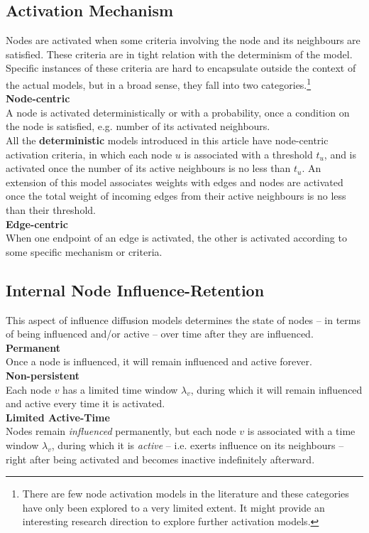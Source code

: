\documentclass[twocolumn, 10pt]{article}
\begin{document}
\subsection{Activation Mechanism}
Nodes are activated when some criteria involving the node and its neighbours are satisfied. These criteria are in tight relation with the determinism of the model. Specific instances of these criteria are hard to encapsulate outside the context of the actual models, but in a broad sense, they fall into two categories.\footnote{There are few node activation models in the literature and these categories have only been explored to a very limited extent. It might provide an interesting research direction to explore further activation models.}\\
\textbf{Node-centric} \\
A node is activated deterministically or with a probability, once a condition on the node is satisfied, e.g. number of its activated neighbours. \\
All the \textbf{deterministic} models introduced in this article have node-centric activation criteria, in which each node $u$ is associated with a threshold $t_u$, and is activated once the number of its active neighbours is no less than $t_u$. An extension of this model associates weights with edges and nodes are activated once the total weight of incoming edges from their active neighbours is no less than their threshold.\\
\textbf{Edge-centric} \\
When one endpoint of an edge is activated, the other is activated according to some specific mechanism or criteria.
\subsection{Internal Node Influence-Retention}
This aspect of influence diffusion models determines the state of nodes -- in terms of being influenced and/or active -- over time after they are influenced. \\
\textbf{Permanent} \\
Once a node is influenced, it will remain influenced and active forever.\\
\textbf{Non-persistent} \\
Each node $v$ has a limited time window $\lambda_v$, during which it will remain influenced and active every time it is activated. \\
\textbf{Limited Active-Time} \label{sec:LAT-dim}\\
Nodes remain \textit{influenced} permanently, but each node $v$ is associated with a time window $\lambda_v$, during which it is \textit{active} -- i.e. exerts influence on its neighbours -- right after being activated and becomes inactive indefinitely afterward. 
\end{document}
